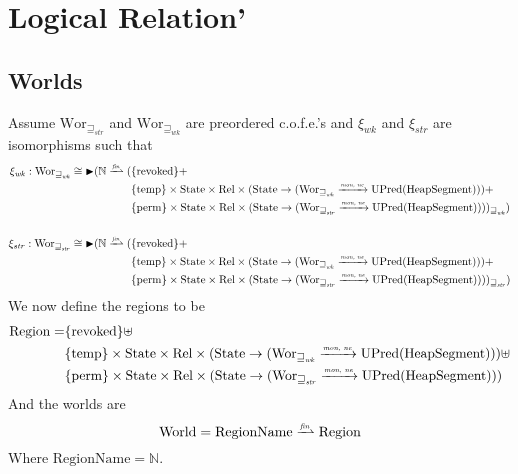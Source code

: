 \documentclass[a4paper]{article}
\newcommand{\finparfun}{\xrightharpoonup{\textit{\tiny{fin}}}}
\newcommand{\monnefun}{\xrightarrow{\textit{\tiny{mon, ne}}}}
\newcommand{\fun}{\rightarrow}
\newcommand{\blater}{\mathop{\blacktriangleright}}
\newcommand{\cofe}{c.o.f.e.}
\newcommand{\cofes}{\cofe{}'s}
\newcommand{\var}[1]{\mathit{#1}}
\newcommand{\future}{\mathbin{\sqsupseteq}}
\newcommand{\futurewk}{\mathbin{\sqsupseteq}_{\var{wk}}}
\newcommand{\futurestr}{\mathbin{\sqsupseteq}_{\var{str}}}
\newcommand{\plaindom}[1]{\mathrm{#1}}
\newcommand{\HeapSegments}{\plaindom{HeapSegment}}
\newcommand{\nats}{\mathbb{N}}
\newcommand{\Rel}{\plaindom{Rel}}
\newcommand{\States}{\plaindom{State}}
\newcommand{\RegionNames}{\plaindom{RegionName}}
\newcommand{\Regions}{\plaindom{Region}}
\newcommand{\Worlds}{\plaindom{World}}
\newcommand{\Wor}{\plaindom{Wor}}
\newcommand{\Worwk}{\Wor_{\futurewk}}
\newcommand{\Worstr}{\Wor_{\futurestr}}
\newcommand{\UPred}[1]{\plaindom{UPred}(#1)}
\newcommand{\plainview}[1]{\mathrm{#1}}
\newcommand{\perma}{\plainview{perm}}
\newcommand{\temp}{\plainview{temp}}
\newcommand{\revoked}{\plainview{revoked}}
\begin{document}
\section{Logical Relation'}
\subsection{Worlds}
Assume $\Worstr$ and $\Worwk$ are preordered \cofes{} and $\xi_{\var{wk}}$ and $\xi_{\var{str}}$ are isomorphisms such that
\begin{align*}
  \xi_{\var{wk}} :   \Worwk \cong \blater (\nats \finparfun (   & \{\revoked\} + \\
                                                                & \{\temp\} \times \States \times \Rel \times (\States \fun (\Worwk \monnefun \UPred{\HeapSegments})) + \\
                                                                & \{\perma\} \times \States \times \Rel \times (\States \fun (\Worstr \monnefun \UPred{\HeapSegments})))_{\future_{\var{wk}}}) \\ \\
  \xi_{\var{str}} :   \Worstr \cong \blater (\nats \finparfun ( & \{\revoked\} + \\
                                                                & \{\temp\} \times \States \times \Rel \times (\States \fun (\Worwk \monnefun \UPred{\HeapSegments})) + \\
                                                                & \{\perma\} \times \States \times \Rel \times (\States \fun (\Worstr \monnefun \UPred{\HeapSegments})))_{\future_{\var{str}}})
\end{align*}
We now define the regions to be
\begin{align*}
  \Regions = & \{\revoked\} \uplus \\
             & \{\temp\} \times \States \times \Rel \times (\States \fun (\Worwk \monnefun \UPred{\HeapSegments})) \uplus \\
             & \{\perma\} \times \States \times \Rel \times (\States \fun (\Worstr \monnefun \UPred{\HeapSegments}))
\end{align*}
And the worlds are
\[
  \Worlds = \RegionNames \finparfun \Regions
\]
Where $\RegionNames = \nats$.
\end{document}
